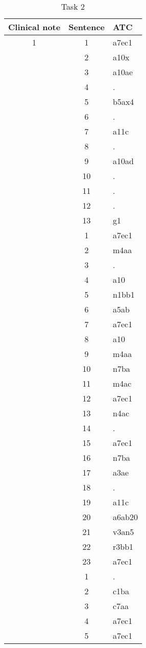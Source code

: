 \begin{table}[htbp] \footnotesize \center
\caption{Task 2\label{tab:task2}}
\begin{tabular}{c c l}
    \toprule
    Clinical note & Sentence & ATC \\
    \midrule
	1 & 1 & a7ec1 \\
	 & 2 & a10x \\
	 & 3 & a10ae \\
	 & 4 & . \\
	 & 5 & b5ax4 \\
	 & 6 & . \\
	 & 7 & a11c \\
	 & 8 & . \\
	 & 9 & a10ad \\
	 & 10 & . \\
	 & 11 & . \\
	 & 12 & . \\
	 & 13 & g1 \\
	\addlinespace
	2 & 1 & a7ec1 \\
	 & 2 & m4aa \\
	 & 3 & . \\
	 & 4 & a10 \\
	 & 5 & n1bb1 \\
	 & 6 & a5ab \\
	 & 7 & a7ec1 \\
	 & 8 & a10 \\
	 & 9 & m4aa \\
	 & 10 & n7ba \\
	 & 11 & m4ac \\
	 & 12 & a7ec1 \\
	 & 13 & n4ac \\
	 & 14 & . \\
	 & 15 & a7ec1 \\
	 & 16 & n7ba \\
	 & 17 & a3ae \\
	 & 18 & . \\
	 & 19 & a11c \\
	 & 20 & a6ab20 \\
	 & 21 & v3an5 \\
	 & 22 & r3bb1 \\
	 & 23 & a7ec1 \\
	\addlinespace
	3 & 1 & . \\
	 & 2 & c1ba \\
	 & 3 & c7aa \\
	 & 4 & a7ec1 \\
	 & 5 & a7ec1 \\

\end{tabular}
\end{table}
